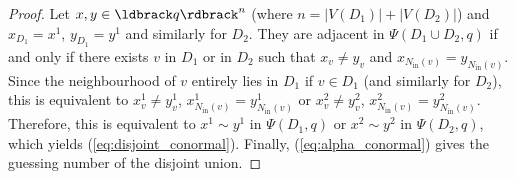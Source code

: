 \documentclass[a4paper, 11pt]{book}
\numberwithin{equation}{section}
\theoremstyle{plain}
\newcommand{\neighbourhood}{N}
\newcommand{\inn}[1]{#1_\mathrm{in}}
\newcommand{\NIn}{\inn{\neighbourhood}}
\newcommand{\guessingGraph}{\Psi}
\renewcommand{\(}{\ldbrack}
\renewcommand{\)}{\rdbrack}
\begin{document}
\begin{proof}
Let $x, y \in \(q\)^n$ (where $n = |V(D_1)| + |V(D_2)|$) and $x_{D_1} = x^1$, $y_{D_1} = y^1$ and similarly for $D_2$. They are adjacent in $\guessingGraph(D_1 \cup D_2,q)$ if and only if there exists $v$ in $D_1$ or in $D_2$ such that $x_v \ne y_v$ and $x_{\NIn(v)} = y_{\NIn(v)}$. Since the neighbourhood of $v$ entirely lies in $D_1$ if $v \in D_1$ (and similarly for $D_2$), this is equivalent to $x^1_v \ne y^1_v$, $x^1_{\NIn(v)} = y^1_{\NIn(v)}$ or $x^2_v \ne y^2_v$, $x^2_{\NIn(v)} = y^2_{\NIn(v)}$. Therefore, this is equivalent to $x^1 \sim y^1$ in $\guessingGraph(D_1,q)$ or $x^2 \sim y^2$ in $\guessingGraph(D_2,q)$, which yields (\ref{eq:disjoint_conormal}). Finally, (\ref{eq:alpha_conormal}) gives the guessing number of the disjoint union.
\end{proof}
\end{document}
